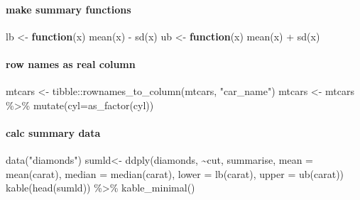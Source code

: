 \documentclass[
]{article}
\newenvironment{Shaded}{\begin{snugshade}}{\end{snugshade}}
\newcommand{\AttributeTok}[1]{\textcolor[rgb]{0.77,0.63,0.00}{#1}}
\newcommand{\ControlFlowTok}[1]{\textcolor[rgb]{0.13,0.29,0.53}{\textbf{#1}}}
\newcommand{\FunctionTok}[1]{\textcolor[rgb]{0.00,0.00,0.00}{#1}}
\newcommand{\NormalTok}[1]{#1}
\newcommand{\OtherTok}[1]{\textcolor[rgb]{0.56,0.35,0.01}{#1}}
\newcommand{\SpecialCharTok}[1]{\textcolor[rgb]{0.00,0.00,0.00}{#1}}
\newcommand{\StringTok}[1]{\textcolor[rgb]{0.31,0.60,0.02}{#1}}
\begin{document}
\hypertarget{make-summary-functions}{%
\paragraph{make summary functions}\label{make-summary-functions}}

\begin{Shaded}
\begin{Highlighting}[]
\NormalTok{lb }\OtherTok{\textless{}{-}} \ControlFlowTok{function}\NormalTok{(x) }\FunctionTok{mean}\NormalTok{(x) }\SpecialCharTok{{-}} \FunctionTok{sd}\NormalTok{(x)}
\NormalTok{ub }\OtherTok{\textless{}{-}} \ControlFlowTok{function}\NormalTok{(x) }\FunctionTok{mean}\NormalTok{(x) }\SpecialCharTok{+} \FunctionTok{sd}\NormalTok{(x)}
\end{Highlighting}
\end{Shaded}

\hypertarget{row-names-as-real-column}{%
\paragraph{row names as real column}\label{row-names-as-real-column}}

\begin{Shaded}
\begin{Highlighting}[]
\NormalTok{mtcars }\OtherTok{\textless{}{-}}\NormalTok{ tibble}\SpecialCharTok{::}\FunctionTok{rownames\_to\_column}\NormalTok{(mtcars, }\StringTok{"car\_name"}\NormalTok{)}
\NormalTok{mtcars }\OtherTok{\textless{}{-}}\NormalTok{ mtcars }\SpecialCharTok{\%\textgreater{}\%} \FunctionTok{mutate}\NormalTok{(}\AttributeTok{cyl=}\FunctionTok{as\_factor}\NormalTok{(cyl))}
\end{Highlighting}
\end{Shaded}

\hypertarget{calc-summary-data}{%
\paragraph{calc summary data}\label{calc-summary-data}}

\begin{Shaded}
\begin{Highlighting}[]
\FunctionTok{data}\NormalTok{(}\StringTok{"diamonds"}\NormalTok{)}
\NormalTok{sumld}\OtherTok{\textless{}{-}} \FunctionTok{ddply}\NormalTok{(diamonds, }\SpecialCharTok{\textasciitilde{}}\NormalTok{cut, summarise, }\AttributeTok{mean =} \FunctionTok{mean}\NormalTok{(carat), }\AttributeTok{median =} \FunctionTok{median}\NormalTok{(carat), }
              \AttributeTok{lower =} \FunctionTok{lb}\NormalTok{(carat), }\AttributeTok{upper =} \FunctionTok{ub}\NormalTok{(carat))}
\FunctionTok{kable}\NormalTok{(}\FunctionTok{head}\NormalTok{(sumld)) }\SpecialCharTok{\%\textgreater{}\%} \FunctionTok{kable\_minimal}\NormalTok{()}
\end{Highlighting}
\end{Shaded}
\end{document}
